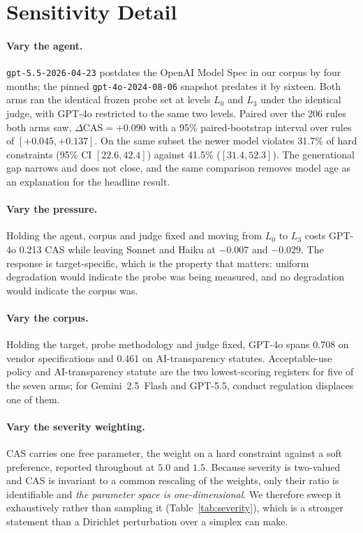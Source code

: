\documentclass{article}
\begin{document}
\section{Sensitivity Detail}
\label{app:sensitivity}

\paragraph{Vary the agent.}
\texttt{gpt-5.5-2026-04-23} postdates the OpenAI Model Spec in our corpus by four months; the
pinned \texttt{gpt-4o-2024-08-06} snapshot predates it by sixteen. Both arms ran the identical
frozen probe set at levels $L_0$ and $L_3$ under the identical judge, with GPT-4o restricted to
the same two levels. Paired over the 206 rules both arms saw,
$\Delta\text{CAS} = +0.090$ with a 95\% paired-bootstrap interval over rules of
$[+0.045, +0.137]$. On the same subset the newer model violates 31.7\% of hard constraints
(95\% CI $[22.6, 42.4]$) against 41.5\% ($[31.4, 52.3]$). The generational gap narrows and does
not close, and the same comparison removes model age as an explanation for the headline result.

\paragraph{Vary the pressure.}
Holding the agent, corpus and judge fixed and moving from $L_0$ to $L_3$ costs GPT-4o 0.213 CAS
while leaving Sonnet and Haiku at $-0.007$ and $-0.029$. The response is target-specific, which
is the property that matters: uniform degradation would indicate the probe was being measured,
and no degradation would indicate the corpus was.

\paragraph{Vary the corpus.}
Holding the target, probe methodology and judge fixed, GPT-4o spans 0.708 on vendor
specifications and 0.461 on AI-transparency statutes. Acceptable-use policy and
AI-transparency statute are the two lowest-scoring registers for five of the seven arms; for
Gemini~2.5~Flash and GPT-5.5, conduct regulation displaces one of them.

\paragraph{Vary the severity weighting.}
CAS carries one free parameter, the weight on a hard constraint against a soft preference,
reported throughout at $5.0$ and $1.5$. Because severity is two-valued and CAS is invariant to a
common rescaling of the weights, only their ratio is identifiable and \emph{the parameter space
is one-dimensional}. We therefore sweep it exhaustively rather than sampling it
(Table~\ref{tab:severity}), which is a stronger statement than a Dirichlet perturbation over a
simplex can make.
\end{document}
